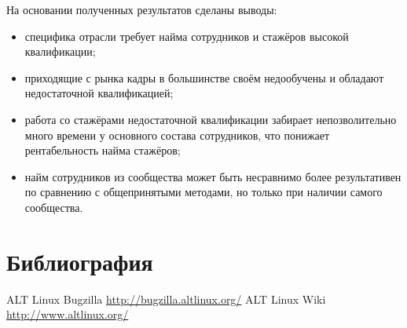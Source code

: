 На основании полученных результатов сделаны выводы:

\begin{itemize}
\item специфика отрасли требует найма сотрудников и стажёров высокой
квалификации;
\item приходящие с рынка кадры в большинстве своём недообучены и
обладают недостаточной квалификацией;
\item работа со стажёрами недостаточной квалификации забирает
непозволительно много времени у основного состава сотрудников, что
понижает рентабельность найма стажёров;
\item найм сотрудников из сообщества может быть несравнимо более
результативен по сравнению с общепринятыми методами, но только при наличии
самого сообщества.
\end{itemize}


\section{Библиография}

\begin{thebibliography}{9}
 ALT Linux Bugzilla \url{http://bugzilla.altlinux.org/}
 ALT Linux Wiki \url{http://www.altlinux.org/}
\end{thebibliography}


